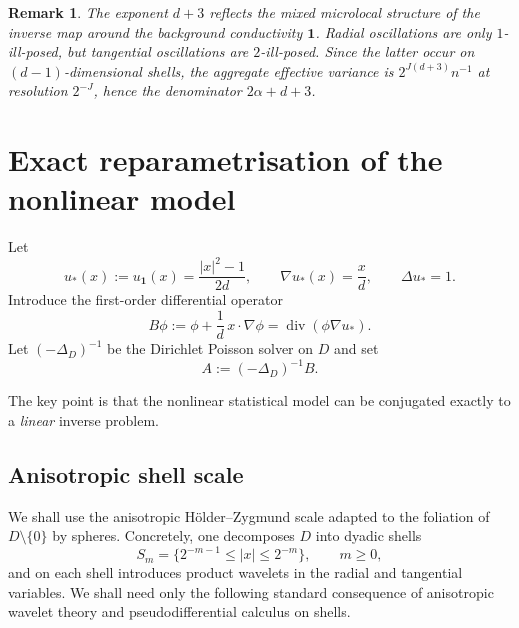 \documentclass[11pt]{article}
\newtheorem{remark}[theorem]{Remark}
\newcommand{\1}{\mathbf 1}
\newcommand{\Div}{\operatorname{div}}
\begin{document}
\begin{remark}
The exponent $d+3$ reflects the mixed microlocal structure of the inverse map around the background conductivity $\1$. Radial oscillations are only $1$-ill-posed, but tangential oscillations are $2$-ill-posed. Since the latter occur on $(d-1)$-dimensional shells, the aggregate effective variance is $2^{J(d+3)}n^{-1}$ at resolution $2^{-J}$, hence the denominator $2\alpha+d+3$.
\end{remark}

\section{Exact reparametrisation of the nonlinear model}

Let
\[
u_\ast(x):=u_{\1}(x)=\frac{|x|^2-1}{2d},
\qquad \nabla u_\ast(x)=\frac{x}{d},
\qquad \Delta u_\ast=1.
\]
Introduce the first-order differential operator
\begin{equation}\label{eq:B-def}
B\phi:=\phi+\frac1d\,x\cdot\nabla\phi=\Div(\phi\nabla u_\ast).
\end{equation}
Let $(-\Delta_D)^{-1}$ be the Dirichlet Poisson solver on $D$ and set
\begin{equation}\label{eq:A-def}
A:=(-\Delta_D)^{-1}B.
\end{equation}

The key point is that the nonlinear statistical model can be conjugated exactly to a \emph{linear} inverse problem.

\subsection*{Anisotropic shell scale}

We shall use the anisotropic Hölder--Zygmund scale adapted to the foliation of $D\setminus\{0\}$ by spheres. Concretely, one decomposes $D$ into dyadic shells
\[
S_m=\{2^{-m-1}\le |x|\le 2^{-m}\},\qquad m\ge0,
\]
and on each shell introduces product wavelets in the radial and tangential variables. We shall need only the following standard consequence of anisotropic wavelet theory and pseudodifferential calculus on shells.
\end{document}
